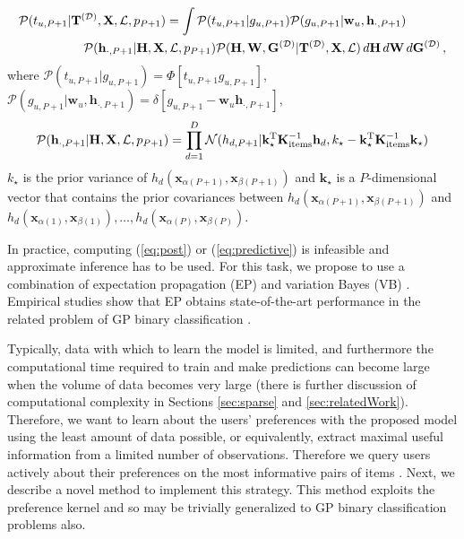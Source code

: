 \begin{align}
\mathcal{P}(t_{u,P+1}|&\mathbf{T}^{(\mathcal{D})},\mathbf{X},\mathcal{L},p_{P+1}) =
\int \mathcal{P}(t_{u,P+1}|g_{u,P+1}) \mathcal{P}(g_{u,P+1}|\mathbf{w}_u,\mathbf{h}_{\cdot,P+1})\notag\\
 & \quad \mathcal{P}(\mathbf{h}_{\cdot,P+1}|\mathbf{H},\mathbf{X},\mathcal{L},p_{P+1})
\mathcal{P}(\mathbf{H},\mathbf{W},\mathbf{G}^{(\mathcal{D})}|\mathbf{T}^{(\mathcal{D})},\mathbf{X},\mathcal{L})
\,d\mathbf{H}\,d\mathbf{W}\,d\mathbf{G}^{(\mathcal{D})}\,,
\label{eq:predictions}
\end{align}
where $\mathcal{P}(t_{u,P+1}|g_{u,P+1})=\Phi[t_{u,P+1}g_{u,P+1}]$,
$\mathcal{P}(g_{u,P+1}|\mathbf{w}_u,\mathbf{h}_{\cdot,P+1})=\delta[ g_{u,P+1} - \mathbf{w}_u \mathbf{h}_{\cdot,P+1}]$,
\begin{equation}
\mathcal{P}(\mathbf{h}_{\cdot,P+1}|\mathbf{H},\mathbf{X},\mathcal{L},p_{P+1})
=\prod_{d=1}^D \mathcal{N}(h_{d,P+1}|\mathbf{k}_\star^\text{T} \mathbf{K}^{-1}_\text{items} \mathbf{h}_d, k_\star -
\mathbf{k}_\star^\text{T}  \mathbf{K}^{-1}_\text{items} \mathbf{k}_\star)
\label{eq:predictive}
\end{equation}
$k_\star$ is the prior variance of $h_d(\mathbf{x}_{\alpha(P+1)}, \mathbf{x}_{\beta(P+1)})$
and $\mathbf{k}_\star$ is a $P$-dimensional vector that contains the prior covariances between $h_d(\mathbf{x}_{\alpha(P+1)}, \mathbf{x}_{\beta(P+1)})$
and $h_d(\mathbf{x}_{\alpha(1)}, \mathbf{x}_{\beta(1)}),\ldots,h_d(\mathbf{x}_{\alpha(P)}, \mathbf{x}_{\beta(P)})$.

In practice, computing (\ref{eq:post}) or (\ref{eq:predictive})
is infeasible and approximate inference has to be used.
For this task, we propose to use a combination of expectation propagation (EP) \cite{Minka2001} and variation Bayes (VB) \cite{Attias1999}.
Empirical studies show that EP obtains state-of-the-art performance 
in the related problem of GP binary classification \cite{nickisch2008}.

Typically, data with which to learn the model is limited, and furthermore the computational 
time required to train and make predictions can become large when the volume of data becomes very large (there is further discussion of computational complexity in Sections \ref{sec:sparse} and \ref{sec:relatedWork}).  
Therefore, we want to learn about the users' preferences with the proposed model
using the least amount of data possible, or equivalently, extract maximal useful information from a 
limited number of observations. Therefore we query
users actively about their preferences on the most informative pairs of items \cite{brochu2007}.
Next, we describe a novel method to implement this strategy.
This method exploits the preference kernel and so may
be trivially generalized to GP binary classification problems also.
